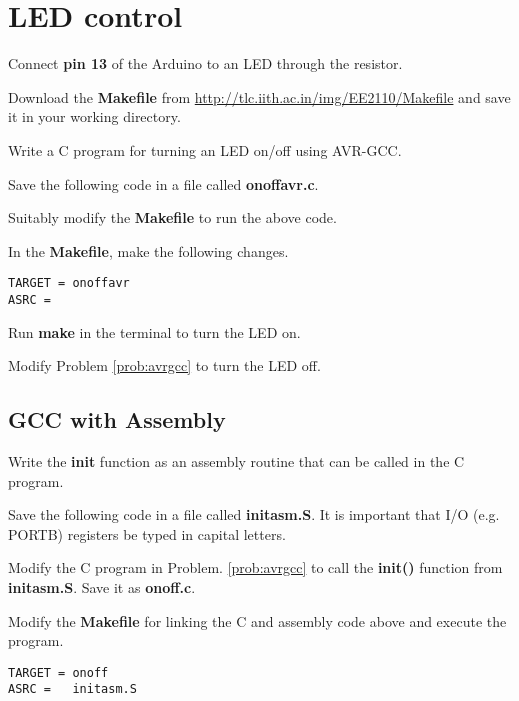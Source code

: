 \documentclass[journal,12pt,twocolumn]{IEEEtran}
\begin{document}
\section{LED control}
\begin{problem}
Connect \textbf{pin 13}  of the Arduino to an LED through the resistor.
\end{problem}
\begin{problem}
Download the \textbf{Makefile} from \url{http://tlc.iith.ac.in/img/EE2110/Makefile} and save it in your working directory.
\end{problem}
\begin{problem}
\label{prob:avrgcc}
Write a C program for turning an LED on/off using AVR-GCC.
\end{problem}
\solution Save the following code in a file called \textbf{onoffavr.c}.  

\begin{problem}
Suitably modify the \textbf{Makefile} to run the above code.
\end{problem}
\solution
In the \textbf{Makefile}, make the following changes.
\begin{lstlisting}
TARGET = onoffavr
ASRC =   
\end{lstlisting}
%
\begin{problem}
Run \textbf{make} in the terminal to turn the LED on.
\end{problem}
\begin{problem}
Modify Problem \ref{prob:avrgcc} to turn the LED off.
\end{problem}

\subsection{GCC with Assembly}
\begin{problem}
Write the \textbf{init} function as an assembly routine that can be called in the C program.
\end{problem}
\solution Save the following code in a file called \textbf{initasm.S}.  It is important that I/O (e.g. PORTB) registers be typed in capital letters.

%
\begin{problem}
\label{prob:gcc-asm}
Modify the C program in Problem. \ref{prob:avrgcc} to call the  \textbf{init()} function from  \textbf{initasm.S}. Save it as \textbf{onoff.c}.
\end{problem}
\solution

\begin{problem}
Modify the \textbf{Makefile} for linking the C and assembly code above and execute the program.
\end{problem}
\solution
\begin{lstlisting}
TARGET = onoff
ASRC =   initasm.S
\end{lstlisting}
\end{document}
